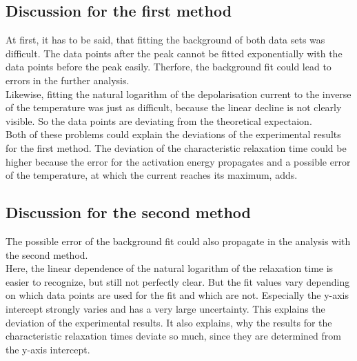 \subsection{Discussion for the first method}
At first, it has to be said, that fitting the background of both data sets was difficult. 
The data points after the peak cannot be fitted exponentially with the data points before the peak easily.
Therfore, the background fit could lead to errors in the further analysis. 
\\
Likewise, fitting the natural logarithm of the depolarisation current to the inverse of the temperature was just as difficult, because the linear decline is not clearly visible.
So the data points are deviating from the theoretical expectaion. 
\\
Both of these problems could explain the deviations of the experimental results for the first method. 
The deviation of the characteristic relaxation time could be higher because the error for the activation energy propagates and a possible error of the temperature, at which the current reaches its maximum, adds. 


\subsection{Discussion for the second method}
The possible error of the background fit could also propagate in the analysis with the second method. 
\\
Here, the linear dependence of the natural logarithm of the relaxation time is easier to recognize, but still not perfectly clear. 
But the fit values vary depending on which data points are used for the fit and which are not. 
Especially the y-axis intercept strongly varies and has a very large uncertainty. 
This explains the deviation of the experimental results.
It also explains, why the results for the characteristic relaxation times deviate so much, since they are determined from the y-axis intercept. 


